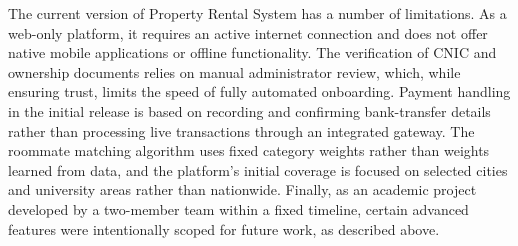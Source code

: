 The current version of Property Rental System has a number of limitations. As a web-only platform, it requires an active internet connection and does not offer native mobile applications or offline functionality. The verification of CNIC and ownership documents relies on manual administrator review, which, while ensuring trust, limits the speed of fully automated onboarding. Payment handling in the initial release is based on recording and confirming bank-transfer details rather than processing live transactions through an integrated gateway. The roommate matching algorithm uses fixed category weights rather than weights learned from data, and the platform's initial coverage is focused on selected cities and university areas rather than nationwide. Finally, as an academic project developed by a two-member team within a fixed timeline, certain advanced features were intentionally scoped for future work, as described above.
